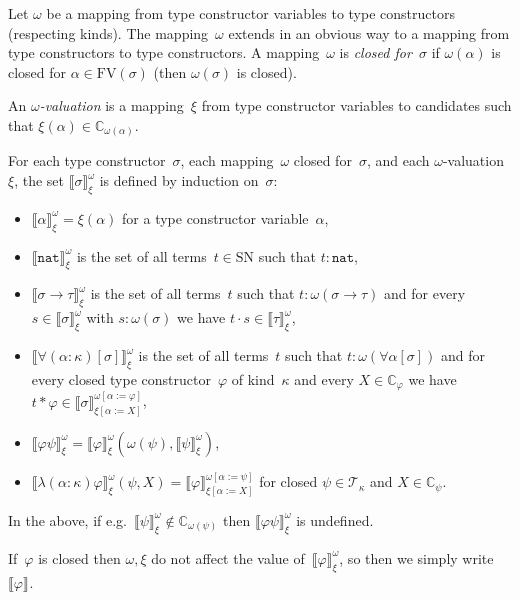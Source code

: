\documentclass[runningheads,a4paper]{llncs}
\newcommand{\arrtype}{\rightarrow}
\newcommand{\app}[2]{#1 \cdot #2}
\newcommand{\tapp}[2]{#1 * #2}
\newcommand{\subst}[2]{#1:=#2}
\newcommand{\FV}{\mathrm{FV}}
\newcommand{\Tc}{\mathcal{T}}
\newcommand{\nat}{\mathtt{nat}}
\newcommand{\SN}{\mathrm{SN}}
\newcommand{\Cb}{\mathbb{C}}
\newcommand{\val}[3]{\ensuremath{\llbracket#1\rrbracket_{#2}^{#3}}}
\begin{document}
\begin{definition}\label{def_computability_valuation}\normalfont
  Let $\omega$ be a mapping from type constructor variables to type
  constructors (respecting kinds). The mapping~$\omega$ extends in an
  obvious way to a mapping from type constructors to type
  constructors. A mapping~$\omega$ is \emph{closed for~$\sigma$} if
  $\omega(\alpha)$ is closed for $\alpha \in \FV(\sigma)$ (then
  $\omega(\sigma)$ is closed).

  An \emph{$\omega$-valuation} is a mapping~$\xi$ from type
  constructor variables to candidates such that $\xi(\alpha) \in
  \Cb_{\omega(\alpha)}$.

  For each type constructor~$\sigma$, each mapping~$\omega$ closed
  for~$\sigma$, and each $\omega$-valuation~$\xi$, the set
  $\val{\sigma}{\xi}{\omega}$ is defined by induction on~$\sigma$:
  \begin{itemize}
  \item $\val{\alpha}{\xi}{\omega} = \xi(\alpha)$ for a type
    constructor variable~$\alpha$,
  \item $\val{\nat}{\xi}{\omega}$ is the set of all terms~$t \in \SN$
    such that $t : \nat$,
  \item $\val{\sigma \arrtype \tau}{\xi}{\omega}$ is the set of all
    terms~$t$ such that $t : \omega(\sigma\arrtype\tau)$ and for
    every~$s \in \val{\sigma}{\xi}{\omega}$ with $s : \omega(\sigma)$
    we have $\app{t}{s} \in \val{\tau}{\xi}{\omega}$,
  \item $\val{\forall(\alpha:\kappa)[\sigma]}{\xi}{\omega}$ is the set
    of all terms~$t$ such that $t : \omega(\forall\alpha[\sigma])$ and
    for every closed type constructor~$\varphi$ of kind~$\kappa$ and
    every $X \in \Cb_\varphi$ we have $\tapp{t}{\varphi} \in
    \val{\sigma}{\xi[\subst{\alpha}{X}]}{\omega[\subst{\alpha}{\varphi}]}$,
  \item
    $\val{\varphi \psi}{\xi}{\omega} =
    \val{\varphi}{\xi}{\omega}(\omega(\psi),\val{\psi}{\xi}{\omega})$,
  \item
    $\val{\lambda(\alpha:\kappa)\varphi}{\xi}{\omega}(\psi,X) =
    \val{\varphi}{\xi[\subst{\alpha}{X}]}{\omega[\subst{\alpha}{\psi}]}$
    for closed $\psi \in \Tc_\kappa$ and $X \in \Cb_\psi$.
  \end{itemize}
  In the above, if e.g.~$\val{\psi}{\xi}{\omega} \notin
  \Cb_{\omega(\psi)}$ then $\val{\varphi \psi}{\xi}{\omega}$ is
  undefined.
\end{definition}

If~$\varphi$ is closed then $\omega,\xi$ do not affect the value
of~$\val{\varphi}{\xi}{\omega}$, so then we simply
write~$\val{\varphi}{}{}$.
\end{document}
